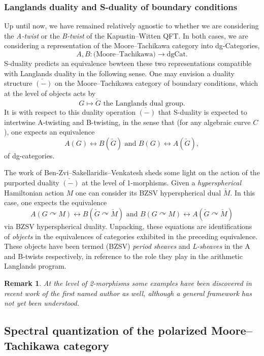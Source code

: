 \documentclass[11pt, a4paper]{amsart}
\numberwithin{equation}{section}
\newtheorem{remark}[theorem]{Remark}
\theoremstyle{definition}
\theoremstyle{remark}
\renewcommand{\to}{\longrightarrow}
\newcommand{\acts}{\curvearrowright}
\begin{document}
\subsubsection{Langlands duality and S-duality of boundary conditions}

Up until now, we have remained relatively agnostic to whether we are considering the \textit{A-twist} or the \textit{B-twist} of the Kapustin--Witten QFT. In both cases, we are considering a representation of the Moore--Tachikawa category into dg-Categories,
\[
A,B : \text{(Moore--Tachikawa)} \to \mathrm{dgCat}.
\]
S-duality predicts an equivalence bewteen these two representations compatible with Langlands duality in the following sense. One may envision a duality structure $\check{(-)}$ on the Moore--Tachikawa category of boundary conditions, which at the level of objects acts by
$$G \longmapsto \check{G} \text{ the Langlands dual group}.$$
It is with respect to this duality operation $\check{(-)}$ that S-duality is expected to intertwine A-twisting and B-twisting, in the sense that (for any algebraic curve $C$), one expects an equivalence 
$$A(G) \leftrightarrow B(\check{G}) \text{ and } B(G) \leftrightarrow A(\check{G}),$$
of dg-categories.

The work of Ben-Zvi--Sakellaridis--Venkatesh \cite{BZSV} sheds some light on the action of the purported duality $\check{(-)}$ at the level of 1-morphisms. Given a \textit{hyperspherical} Hamiltonian action $M$ one can consider its BZSV hyperspherical dual $\check{M}$. In this case, one expects the equivalence
$$A(G \acts M) \leftrightarrow B(\check{G} \acts \check{M}) \text{ and } B(G \acts M) \leftrightarrow A(\check{G} \acts \check{M})$$
via BZSV hyperspherical duality. Unpacking, these equations are identifications of \textit{objects} in the equivalences of categories exhibited in the preceding equivalence. These objects have been termed (BZSV) \textit{period sheaves} and \textit{L-sheaves} in the A and B-twists respectively, in reference to the role they play in the arithmetic Langlands program.

\begin{remark}
At the level of 2-morphisms some examples have been discovered in recent work of the first named author \cite{CHY} as well, although a general framework has not yet been understood. 
\end{remark}








\subsection{Spectral quantization of the polarized Moore--Tachikawa category}
\label{sc spectral quantization}
\end{document}
